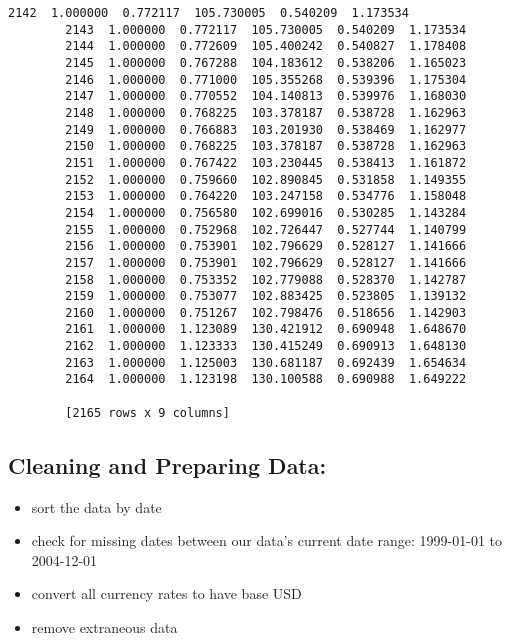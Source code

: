 \documentclass[11pt]{article}
\providecommand{\tightlist}{%
      \setlength{\itemsep}{0pt}\setlength{\parskip}{0pt}}
\begin{document}
\begin{Verbatim}[commandchars=\\\{\}]
        2142  1.000000  0.772117  105.730005  0.540209  1.173534  
        2143  1.000000  0.772117  105.730005  0.540209  1.173534  
        2144  1.000000  0.772609  105.400242  0.540827  1.178408  
        2145  1.000000  0.767288  104.183612  0.538206  1.165023  
        2146  1.000000  0.771000  105.355268  0.539396  1.175304  
        2147  1.000000  0.770552  104.140813  0.539976  1.168030  
        2148  1.000000  0.768225  103.378187  0.538728  1.162963  
        2149  1.000000  0.766883  103.201930  0.538469  1.162977  
        2150  1.000000  0.768225  103.378187  0.538728  1.162963  
        2151  1.000000  0.767422  103.230445  0.538413  1.161872  
        2152  1.000000  0.759660  102.890845  0.531858  1.149355  
        2153  1.000000  0.764220  103.247158  0.534776  1.158048  
        2154  1.000000  0.756580  102.699016  0.530285  1.143284  
        2155  1.000000  0.752968  102.726447  0.527744  1.140799  
        2156  1.000000  0.753901  102.796629  0.528127  1.141666  
        2157  1.000000  0.753901  102.796629  0.528127  1.141666  
        2158  1.000000  0.753352  102.779088  0.528370  1.142787  
        2159  1.000000  0.753077  102.883425  0.523805  1.139132  
        2160  1.000000  0.751267  102.798476  0.518656  1.142903  
        2161  1.000000  1.123089  130.421912  0.690948  1.648670  
        2162  1.000000  1.123333  130.415249  0.690913  1.648130  
        2163  1.000000  1.125003  130.681187  0.692439  1.654634  
        2164  1.000000  1.123198  130.100588  0.690988  1.649222  
        
        [2165 rows x 9 columns]
\end{Verbatim}
            
    \subsection{Cleaning and Preparing
Data:}\label{cleaning-and-preparing-data}

\begin{itemize}
\tightlist
\item
  sort the data by date
\item
  check for missing dates between our data's current date range:
  1999-01-01 to 2004-12-01
\item
  convert all currency rates to have base USD
\item
  remove extraneous data
\end{itemize}
\end{document}
